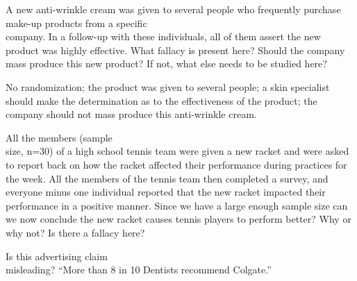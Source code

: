 \documentclass[11pt, chapterprefix=true]{scrbook}\usepackage[]{graphicx}\usepackage[]{color}
\begin{document}
\begin{exercises}
\begin{exercise}

  \end{exercise}

\begin{exercise}  %

A new anti-wrinkle cream was given to several people who frequently purchase make-up products from a specific \\ company.  In a follow-up with these individuals, all of them assert the new product was highly effective.  What fallacy is present here?  Should the company mass produce this new product? If not, what else needs to be studied here?

\end{exercise}
\begin{solution}  %

No randomization; the product was given to several people; a skin specialist should make the determination as to the effectiveness of the product; the company should not mass produce this anti-wrinkle cream.

\end{solution}

\begin{exercise}  %

All the members (sample \\ size, n=30) of a high school tennis team were given a new racket and were asked to report back on how the racket affected their performance during practices for the week.  All the members of the tennis team then completed a survey, and everyone minus one individual reported that the new racket impacted their performance in a positive manner.  Since we have a large enough sample size can we now conclude the new racket causes tennis players to perform better?  Why or why not?  Is there a fallacy here?

	\end{exercise}

\begin{exercise}   %

Is this advertising claim \\ misleading? 
``More than 8 in 10 Dentists recommend Colgate.''


\end{exercise}
\end{exercises}
\end{document}
